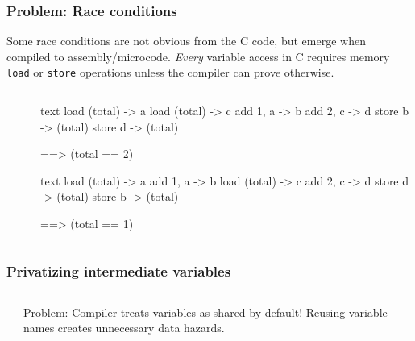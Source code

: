 \documentclass[handout]{beamer}
\begin{document}
\begin{frame}[fragile]
  \frametitle{Problem: Race conditions}
  Some race conditions are not obvious from the C code, but emerge when compiled to assembly/microcode. \emph{Every} variable access in C requires memory \texttt{load} or \texttt{store} operations unless the compiler can prove otherwise. 
  
  \begin{columns}[t]%
    \begin{column}{0.43\textwidth}
    \end{column}

    \begin{column}{0.43\textwidth}
    \end{column}
    
    \begin{column}{0.3\textwidth}
      \begin{ccode}[after skip=4pt]
        {text}
        load (total) -> a
          load (total) -> c
        add 1, a -> b
          add 2, c -> d
        store b -> (total)
          store d -> (total)

          ==> (total == 2)\end{ccode}
      \begin{ccode}[]
        {text}
        load (total) -> a
        add 1, a -> b
          load (total) -> c
          add 2, c -> d
          store d -> (total)
        store b -> (total)
        
          ==> (total == 1)\end{ccode}
    \end{column}
  \end{columns}
\end{frame}



\begin{frame}[fragile]
  \frametitle{Privatizing intermediate variables}
  \begin{columns}[t]%
    \begin{column}{0.6\textwidth}
    \end{column}

    \pause
    \begin{column}{0.4\textwidth}
      Problem: Compiler treats variables as shared by default! Reusing variable names creates unnecessary data hazards.
    \end{column}
  \end{columns}
\end{frame}
\end{document}
